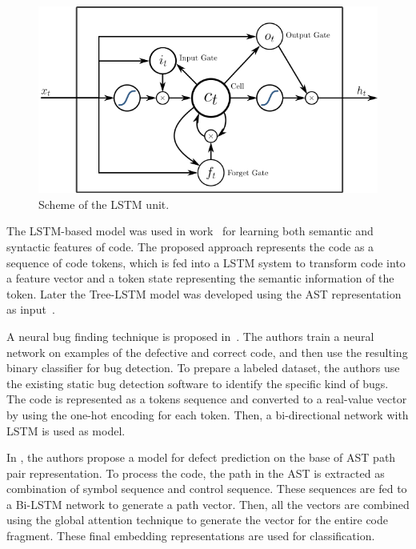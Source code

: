 \documentclass[mathematics,review,submit,moreauthors,pdftex]{Definitions/mdpi}
\begin{document}
\begin{figure}[ht] %
\centering
\includegraphics[width=11.5 cm]{f3.png}
\caption{Scheme of the LSTM unit.}
\label{fig3} %
\end{figure}


The LSTM-based model was used in work~\cite{DamEtAl2018} for learning both semantic and syntactic features of code. The proposed approach represents the code as a sequence of code tokens, which is fed into a LSTM system to transform code into a feature vector and a token state representing the semantic information of the token. Later the Tree-LSTM model was developed using the AST representation as input~\cite{DamEtAl2019}.

A neural bug finding technique is proposed in~\cite{HabibPradel2019}. The authors train a neural network on examples of the defective and correct code, and then use the resulting binary classifier for bug detection.
To prepare a labeled dataset, the authors use the existing static bug detection software to identify the specific kind of bugs.
The code is represented as a tokens sequence and converted to a real-value vector by using the one-hot encoding for each token.
Then, a bi-directional network with LSTM is used as model.

In \cite{ShiEtAl2020}, the authors propose a model for defect prediction on the base of AST path pair representation.
To process the code, the path in the AST is extracted as combination of symbol sequence and control sequence. These sequences are fed to a Bi-LSTM network to generate a path vector. Then, all the vectors are combined using the global attention technique to generate the vector for the entire code fragment. These final embedding representations are used for classification.
\end{document}
